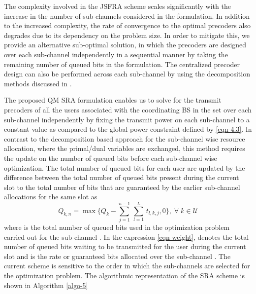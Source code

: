 
The complexity involved in the \ac{JSFRA} scheme scales significantly with the increase in the number of sub-channels considered in the formulation. In addition to the increased complexity, the rate of convergence to the optimal precoders also degrades due to its dependency on the problem size. In order to mitigate this, we provide an alternative sub-optimal solution, in which the precoders are designed over each sub-channel independently in a sequential manner by taking the remaining number of queued bits in the formulation. The centralized precoder design can also be performed across each sub-channel by using the decomposition methods discussed in \cite{palomar2006tutorial,boyd2011distributed}.

The proposed \acl{QM} \ac{SRA} formulation enables us to solve for the transmit precoders of all the users associated with the coordinating \ac{BS} in the set  over each sub-channel independently by fixing the transmit power on each sub-channel to a constant value  as compared to the global power constraint defined by \eqref{eqn-4.3}. In contrast to the decomposition based approach for the sub-channel wise resource allocation, where the primal/dual variables are exchanged, this method requires the update on the number of queued bits before each sub-channel wise optimization. The total number of queued bits for each user are updated by the difference between the total number of queued bits present during the current slot to the total number of bits that are guaranteed by the earlier sub-channel allocations for the same slot as
\begin{equation}
Q_{k,n} = \max{\Big \lbrace Q_k - \sum_{j = 1}^{n-1} \, \sum_{l = 1}^{L} \, t_{l,k,j} ,0 \Big \rbrace }, \; \forall \; k \in \mathcal{U}
\label{eqn-weight}
\end{equation}
where  is the total number of queued bits used in the optimization problem carried out for the sub-channel . In the expression \eqref{eqn-weight},  denotes the total number of queued bits waiting to be transmitted for the user  during the current slot and  is the rate or guaranteed bits allocated over the sub-channel . The current scheme is sensitive to the order in which the sub-channels are selected for the optimization problem. The algorithmic representation of the \ac{SRA} scheme is shown in Algorithm \ref{algo-5}
